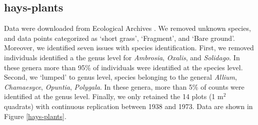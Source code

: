 \documentclass[11pt, oneside]{article}
\begin{document}
\subsection{hays-plants}
Data were downloaded from Ecological Archives \citep{hay_data}.
We removed unknown species, and data points categorized as `short grass', `Fragment', and `Bare ground'. 
Moreover, we identified seven issues with species identification. 
First, we removed individuals identified a the genus level for \textit{Ambrosia}, \textit{Oxalis}, and \textit{Solidago}. 
In these genera more than 95\% of individuals were identified at the species level. 
Second, we `lumped' to genus level, species belonging to the general \textit{Allium}, \textit{Chamaesyce}, \textit{Opuntia}, \textit{Polygala}. 
In these genera, more than 5\% of counts were identified at the genus level. 
Finally, we only retained the 14 plots (1 m$^2$ quadrats) with continuous replication between 1938 and 1973.
Data are shown in Figure \ref{hays-plants}.
\end{document}
